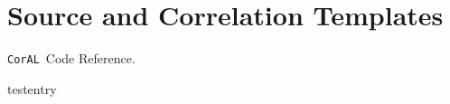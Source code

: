 \documentclass[aps,prc,twocolumn,floatfix,preprintnumbers]{revtex4}
\newcommand{\coral}{{\tt CorAL}}
\begin{document}
\section{Source and Correlation Templates}

\onecolumngrid
\begin{thebibliography}{70}

   \coral\, Code Reference.

   testentry 

\end{thebibliography}
\end{document}
